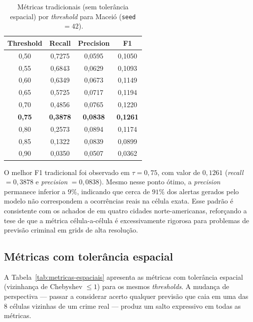 \begin{table}[htb]
\centering
\caption{Métricas tradicionais (sem tolerância espacial) por \textit{threshold} para Maceió (\texttt{seed} $= 42$).}
\label{tab:metricas-tradicionais}
\begin{tabular}{cccc}
\hline
\textbf{Threshold} & \textbf{Recall} & \textbf{Precision} & \textbf{F1} \\
\hline
0{,}50 & 0{,}7275 & 0{,}0595 & 0{,}1050 \\
0{,}55 & 0{,}6843 & 0{,}0629 & 0{,}1093 \\
0{,}60 & 0{,}6349 & 0{,}0673 & 0{,}1149 \\
0{,}65 & 0{,}5725 & 0{,}0717 & 0{,}1194 \\
0{,}70 & 0{,}4856 & 0{,}0765 & 0{,}1220 \\
\textbf{0{,}75} & \textbf{0{,}3878} & \textbf{0{,}0838} & \textbf{0{,}1261} \\
0{,}80 & 0{,}2573 & 0{,}0894 & 0{,}1174 \\
0{,}85 & 0{,}1322 & 0{,}0839 & 0{,}0899 \\
0{,}90 & 0{,}0350 & 0{,}0507 & 0{,}0362 \\
\hline
\end{tabular}
\end{table}

O melhor F1 tradicional foi observado em $\tau = 0{,}75$, com valor de $0{,}1261$ (\textit{recall} $= 0{,}3878$ e \textit{precision} $= 0{,}0838$). Mesmo nesse ponto ótimo, a \textit{precision} permanece inferior a $9\%$, indicando que cerca de $91\%$ dos alertas gerados pelo modelo não correspondem a ocorrências reais na célula exata. Esse padrão é consistente com os achados de  em quatro cidades norte-americanas, reforçando a tese de que a métrica célula-a-célula é excessivamente rigorosa para problemas de previsão criminal em grids de alta resolução.

\subsection{Métricas com tolerância espacial}
\label{Sec:MetricasEspaciais}

A Tabela~\ref{tab:metricas-espaciais} apresenta as métricas com tolerância espacial (vizinhança de Chebyshev $\leq 1$) para os mesmos \textit{thresholds}. A mudança de perspectiva --- passar a considerar acerto qualquer previsão que caia em uma das $8$ células vizinhas de um crime real --- produz um salto expressivo em todas as métricas.

